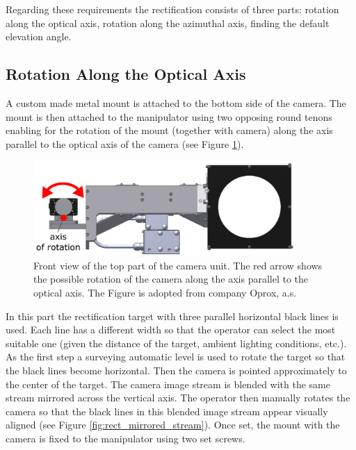Regarding these requirements the rectification consists of three parts: rotation along the optical axis, rotation along the azimuthal axis, finding the default elevation angle.


\subsection{Rotation Along the Optical Axis}

A custom made metal mount is attached to the bottom side of the camera. The mount is then attached to the manipulator using two opposing round tenons enabling for the rotation of the mount (together with camera) along the axis parallel to the optical axis of the camera (see Figure \ref{fig:rect_model_front_view}).

\begin{figure}[htb]
	\centering
	\includegraphics[width=10cm]{fig/rect_model_front_view.png}
	\caption{Front view of the top part of the camera unit. The red arrow shows the possible rotation of the camera along the axis parallel to the optical axis. The Figure is adopted from company Oprox, a.s.}
	\label{fig:rect_model_front_view}
\end{figure}

In this part the rectification target with three parallel horizontal black lines is used. Each line has a different width so that the operator can select the most suitable one (given the distance of the target, ambient lighting conditions, etc.). As the first step a surveying automatic level is used to rotate the target so that the black lines become horizontal. Then the camera is pointed approximately to the center of the target. The camera image stream is blended with the same stream mirrored across the vertical axis. The operator then manually rotates the camera so that the black lines in this blended image stream appear visually aligned (see Figure \ref{fig:rect_mirrored_stream}). Once set, the mount with the camera is fixed to the manipulator using two set screws.

